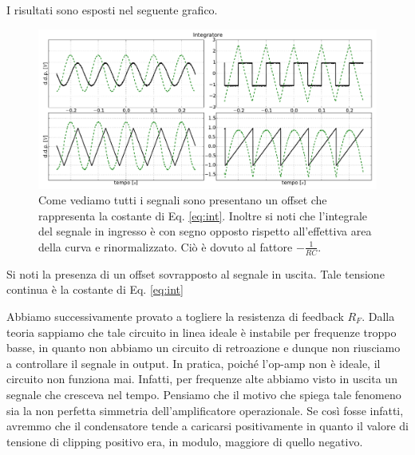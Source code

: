 I risultati sono esposti nel seguente grafico.

\begin{figure}[h]
	\centering
			\includegraphics[width=.9\textwidth]{int_serie_11.pdf}
			\caption{Come vediamo tutti i segnali sono presentano un offset che rappresenta la costante di Eq. \eqref{eq:int}. Inoltre si noti che l'integrale del segnale in ingresso è con segno opposto rispetto all'effettiva area della curva e rinormalizzato. Ciò è dovuto al fattore $-\frac{1}{RC}$.	}
			\label{fig:der}
\end{figure}

Si noti la presenza di un offset sovrapposto al segnale in uscita. Tale tensione continua è la costante di Eq. \eqref{eq:int}



Abbiamo successivamente provato a togliere la resistenza di feedback $R_F$.
Dalla teoria sappiamo che tale circuito in linea ideale è instabile per frequenze troppo basse, in quanto non abbiamo un circuito di retroazione e dunque non riusciamo a controllare il segnale in output.
In pratica, poiché l'op-amp non è ideale, il circuito non funziona mai.
Infatti, per frequenze alte abbiamo visto in uscita un segnale che cresceva nel tempo.
Pensiamo che il motivo che spiega tale fenomeno sia la non perfetta simmetria dell'amplificatore operazionale.
Se così fosse infatti, avremmo che il condensatore tende a caricarsi positivamente in quanto il valore di tensione di clipping positivo era, in modulo, maggiore di quello negativo.
